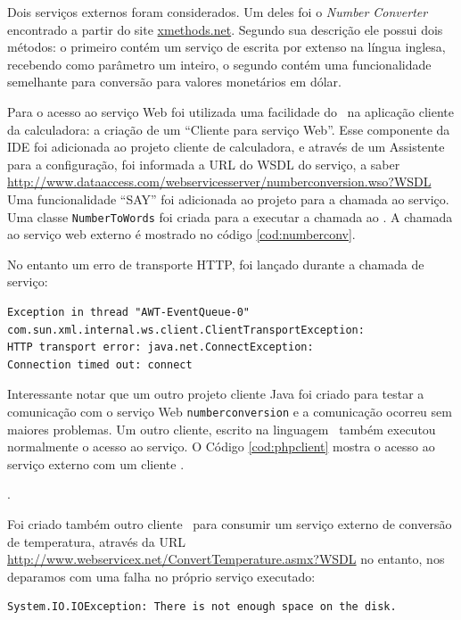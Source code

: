 Dois serviços externos foram considerados. Um deles foi o \textit{Number
Converter} encontrado a partir do site \url{xmethods.net}. Segundo sua descrição
ele possui dois métodos: o primeiro contém um serviço de escrita por extenso na
língua inglesa, recebendo como parâmetro um inteiro, o segundo contém uma
funcionalidade semelhante para conversão para valores monetários em dólar.

Para o acesso ao serviço Web foi utilizada uma facilidade do \NetBeans\ na
aplicação cliente da calculadora: a criação de um ``Cliente para serviço Web''.
Esse componente da IDE foi adicionada ao projeto cliente de calculadora, e
através de um Assistente para a configuração, foi informada a URL do WSDL do
serviço, a saber
\url{http://www.dataaccess.com/webservicesserver/numberconversion.wso?WSDL} Uma
funcionalidade ``SAY'' foi adicionada ao projeto para a chamada ao serviço. Uma
classe \texttt{NumberToWords} foi criada para a executar a chamada ao
\WebService. A chamada ao serviço web externo é mostrado no código
\ref{cod:numberconv}.



No entanto um erro de transporte HTTP, foi lançado durante a chamada de serviço:

\begin{lstlisting}
Exception in thread "AWT-EventQueue-0" 
com.sun.xml.internal.ws.client.ClientTransportException: 
HTTP transport error: java.net.ConnectException: 
Connection timed out: connect
\end{lstlisting}

Interessante notar que um outro projeto cliente Java foi criado para testar a
comunicação com o serviço Web \texttt{numberconversion} e a comunicação ocorreu
sem maiores problemas.  Um outro cliente, escrito na linguagem \php\ também
executou normalmente o acesso ao serviço. O Código \ref{cod:phpclient} mostra o
acesso ao serviço externo com um cliente \php. 

.

Foi criado também outro cliente \php\ para consumir um serviço externo de
conversão de temperatura, através da URL
\url{http://www.webservicex.net/ConvertTemperature.asmx?WSDL} no entanto, nos
deparamos com uma falha no próprio serviço executado:

\begin{lstlisting}
System.IO.IOException: There is not enough space on the disk.
\end{lstlisting}

